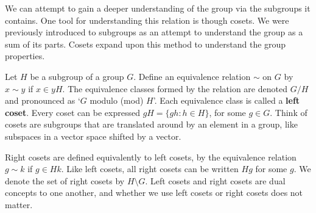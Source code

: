 \begin{center}
\end{center}

We can attempt to gain a deeper understanding of the group via the subgroups it contains. One tool for understanding this relation is though cosets. We were previously introduced to subgroups as an attempt to understand the group as a sum of its parts. Cosets expand upon this method to understand the group properties.

\begin{definition}
    Let $H$ be a subgroup of a group $G$. Define an equivalence relation $\sim$ on $G$ by $x \sim y$ if $x \in yH$. The equivalence classes formed by the relation are denoted $G/H$ and pronounced as `$G$ modulo (mod) $H$'. Each equivalence class is called a {\bf left coset}. Every coset can be expressed $gH = \{ gh : h \in H \}$, for some $g \in G$. Think of cosets are subgroups that are translated around by an element in a group, like subspaces in a vector space shifted by a vector.
\end{definition}

Right cosets are defined equivalently to left cosets, by the equivalence relation $g \sim k$ if $g \in Hk$. Like left cosets, all right cosets can be written $Hg$ for some $g$. We denote the set of right cosets by $H \setminus G$. Left cosets and right cosets are dual concepts to one another, and whether we use left cosets or right cosets does not matter.


